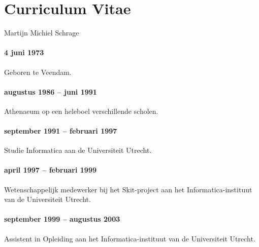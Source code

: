 \chapter*{Curriculum Vitae}
\label{chap:cv}

Martijn Michiel Schrage

\subsubsection*{4 juni 1973}
Geboren te Veendam.

\subsubsection*{augustus 1986 -- juni 1991}
Athenaeum op een heleboel verschillende scholen.

\subsubsection*{september 1991 -- februari 1997}
Studie Informatica aan de Universiteit Utrecht.

\subsubsection*{april 1997 -- februari 1999}
Wetenschappelijk medewerker bij het Skit-project aan het Informatica-instituut van de
Universiteit Utrecht.

\subsubsection*{september 1999 -- augustus 2003}
Assistent in Opleiding aan het Informatica-instituut van de
Universiteit Utrecht.


